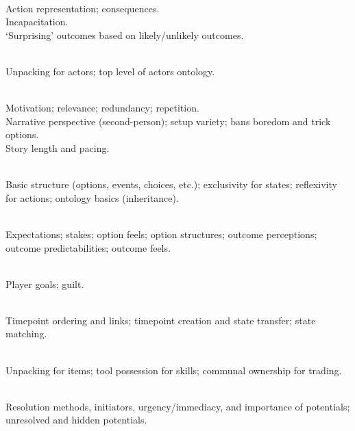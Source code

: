 \begin{table}[!p]
\begin{minipage}[t][0.935\textheight]{\dimexpr0.5\textwidth-1.2em}
\begin{hangparas}{0.8em}{1}
\setlength{\parskip}{0.5em}
 \\
  \cg{[representational]} Action representation; consequences. \\
  \cg{[constituent]} Incapacitation. \\
  \cg{[poetic]} `Surprising' outcomes based on likely/unlikely outcomes.

 \\
  \cg{[representatonal]} Unpacking for actors; top level of actors ontology.

 \\
  \cg{[constituent]} Motivation; relevance; redundancy; repetition.  \\
  \cg{[aesthetic]} Narrative perspective (second-person); setup variety; bans boredom and trick options. \\
  \cg{[poetic]} Story length and pacing.

   \\
  \cg{[representational]} Basic structure (options, events, choices, etc.); exclusivity for states; reflexivity for actions; ontology basics (inheritance).

   \\
  \cg{[poetic]} Expectations; stakes; option feels; option structures; outcome perceptions; outcome predictabilities; outcome feels.

   \\
  \cg{[poetic]} Player goals; guilt.

   \\
  \cg{[representational]} Timepoint ordering and links; timepoint creation and state transfer; state matching.

   \\
  \cg{[representational]} Unpacking for items; tool possession for skills; communal ownership for trading.
\end{hangparas}%
\end{minipage}%
\hfill
\noindent
\begin{minipage}[t][0.935\textheight]{\dimexpr0.5\textwidth-1.2em}
\begin{hangparas}{0.8em}{1}
\setlength{\parskip}{0.5em}
   \\
  \cg{[representational]} Resolution methods, initiators, urgency/immediacy, and importance of potentials; unresolved and hidden potentials.


\end{hangparas}
\end{minipage}
\end{table}
